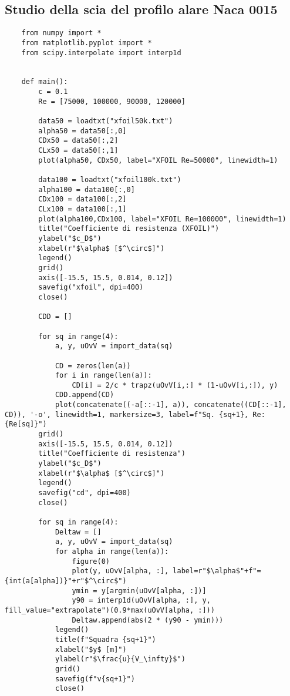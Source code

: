 \subsection{Studio della scia del profilo alare Naca 0015}\label{b6}
\begin{lstlisting}
    from numpy import *
    from matplotlib.pyplot import *
    from scipy.interpolate import interp1d
    
    
    def main():
        c = 0.1
        Re = [75000, 100000, 90000, 120000]
    
        data50 = loadtxt("xfoil50k.txt")
        alpha50 = data50[:,0]
        CDx50 = data50[:,2]
        CLx50 = data50[:,1]
        plot(alpha50, CDx50, label="XFOIL Re=50000", linewidth=1)
    
        data100 = loadtxt("xfoil100k.txt")
        alpha100 = data100[:,0]
        CDx100 = data100[:,2]
        CLx100 = data100[:,1]
        plot(alpha100,CDx100, label="XFOIL Re=100000", linewidth=1)
        title("Coefficiente di resistenza (XFOIL)")
        ylabel("$c_D$")
        xlabel(r"$\alpha$ [$^\circ$]")
        legend()
        grid()
        axis([-15.5, 15.5, 0.014, 0.12])
        savefig("xfoil", dpi=400)
        close()
        
        CDD = []
    
        for sq in range(4):
            a, y, uOvV = import_data(sq)
    
            CD = zeros(len(a))
            for i in range(len(a)):
                CD[i] = 2/c * trapz(uOvV[i,:] * (1-uOvV[i,:]), y)
            CDD.append(CD)
            plot(concatenate((-a[::-1], a)), concatenate((CD[::-1], CD)), '-o', linewidth=1, markersize=3, label=f"Sq. {sq+1}, Re: {Re[sq]}")
        grid()
        axis([-15.5, 15.5, 0.014, 0.12])
        title("Coefficiente di resistenza")
        ylabel("$c_D$")
        xlabel(r"$\alpha$ [$^\circ$]")
        legend()
        savefig("cd", dpi=400)
        close()
    
        for sq in range(4):
            Deltaw = []
            a, y, uOvV = import_data(sq)
            for alpha in range(len(a)):
                figure(0)
                plot(y, uOvV[alpha, :], label=r"$\alpha$"+f"={int(a[alpha])}"+r"$^\circ$")
                ymin = y[argmin(uOvV[alpha, :])]
                y90 = interp1d(uOvV[alpha, :], y, fill_value="extrapolate")(0.9*max(uOvV[alpha, :]))
                Deltaw.append(abs(2 * (y90 - ymin)))
            legend()
            title(f"Squadra {sq+1}")
            xlabel("$y$ [m]")
            ylabel(r"$\frac{u}{V_\infty}$")
            grid()
            savefig(f"v{sq+1}")
            close()
    

\end{lstlisting}
